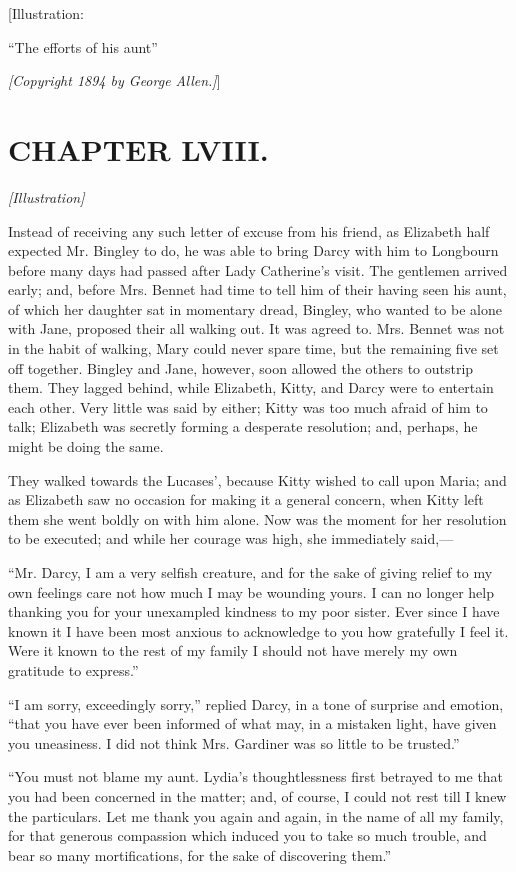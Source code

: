 \documentclass[12pt]{book}
\begin{document}
[Illustration:

``The efforts of his aunt''

\emph{[\textit{Copyright 1894 by George Allen.}]}]

\chapter{CHAPTER LVIII.}

\emph{[Illustration]}

Instead of receiving any such letter of excuse from his friend, as Elizabeth half expected Mr. Bingley to do, he was able to bring Darcy with him to Longbourn before many days had passed after Lady Catherine's visit. The gentlemen arrived early; and, before Mrs. Bennet had time to tell him of their having seen his aunt, of which her daughter sat in momentary dread, Bingley, who wanted to be alone with Jane, proposed their all walking out. It was agreed to. Mrs. Bennet was not in the habit of walking, Mary could never spare time, but the remaining five set off together. Bingley and Jane, however, soon allowed the others to outstrip them. They lagged behind, while Elizabeth, Kitty, and Darcy were to entertain each other. Very little was said by either; Kitty was too much afraid of him to talk; Elizabeth was secretly forming a desperate resolution; and, perhaps, he might be doing the same.

They walked towards the Lucases', because Kitty wished to call upon Maria; and as Elizabeth saw no occasion for making it a general concern, when Kitty left them she went boldly on with him alone. Now was the moment for her resolution to be executed; and while her courage was high, she immediately said,---

``Mr. Darcy, I am a very selfish creature, and for the sake of giving relief to my own feelings care not how much I may be wounding yours. I can no longer help thanking you for your unexampled kindness to my poor sister. Ever since I have known it I have been most anxious to acknowledge to you how gratefully I feel it. Were it known to the rest of my family I should not have merely my own gratitude to express.''

``I am sorry, exceedingly sorry,'' replied Darcy, in a tone of surprise and emotion, ``that you have ever been informed of what may, in a mistaken light, have given you uneasiness. I did not think Mrs. Gardiner was so little to be trusted.''

``You must not blame my aunt. Lydia's thoughtlessness first betrayed to me that you had been concerned in the matter; and, of course, I could not rest till I knew the particulars. Let me thank you again and again, in the name of all my family, for that generous compassion which induced you to take so much trouble, and bear so many mortifications, for the sake of discovering them.''
\end{document}
